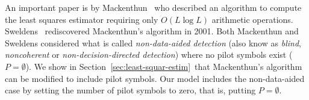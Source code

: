 \documentclass[journal]{IEEEtran}
\begin{document}

An important paper is by Mackenthun~\cite{Mackenthun1994} who described an algorithm to compute the least squares estimator requiring only $O(L \log L)$ arithmetic operations.  Sweldens~\cite{Sweldens2001} rediscovered Mackenthun's algorithm in 2001.  Both Mackenthun and Sweldens considered what is called \emph{non-data-aided detection} (also know as \emph{blind}, \emph{noncoherent} or \emph{non-decision-directed detection}) where no pilot symbols exist ($P = \emptyset$).  We show in Section~\ref{sec:least-squar-estim}~that Mackenthun's algorithm can be modified to include pilot symbols. Our model includes the non-data-aided case by setting the number of pilot symbols to zero, that is, putting $P = \emptyset$.
\end{document}
